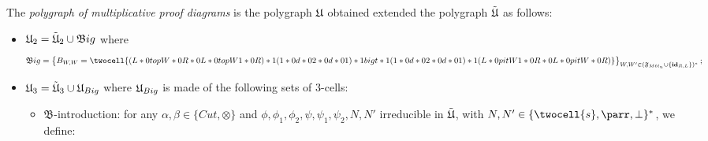 \documentclass[a4paper]{article}
\begin{document}
\begin{definition}
The \emph{polygraph of multiplicative proof diagrams} is the polygraph $\mathfrak{U}$ obtained extended the polygraph ${\tilde{\mathfrak{U}}}$ as follows:
\begin{itemize}
\item $\mathfrak{U}_2={\tilde{\mathfrak{U}}}_2 \cup \mathfrak Big$ where $$\mathfrak Big =\begin{Bmatrix}
B_{W, W}= \twocell{(L *0 topW *0 R *0 L *0 topW1 *0 R) *1 (1 *0 d *0 2 *0 d *0 1) *1 bigt *1 (1 *0 d *0 2 *0 d *0 1) *1 (L *0 pitW1 *0 R *0 L *0 pitW *0 R)}
\end{Bmatrix}_{W, W' \in (\fmllc\cup \{\id_{R,L}\})^*};$$

\item $\mathfrak{U}_3={\tilde{\mathfrak{U}}}_3 \cup \mathfrak{U}_{Big}$  where $\mathfrak{U}_{Big}$ is made of the following sets of $3$-cells: 

\begin{itemize} 
\item $\mathfrak B$-introduction: for any $\alpha, \beta \in \{Cut, \otimes\}$  and $\phi,\phi_1,\phi_2,\psi, \psi_1, \psi_2, N,N'$ irreducible in ${\tilde{\mathfrak{U}}}$, with $N,N'\in \{\twocell{s}, \parr, \bot \}^*$,
we define:


\end{itemize}
\end{itemize}
\end{definition}
\end{document}
